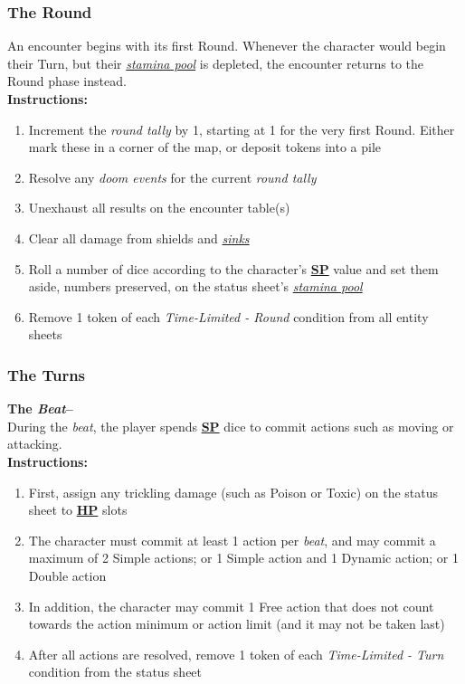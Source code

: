 \documentclass[12pt]{article}
\newcommand{\refto}[1]{\hyperlink{#1}{\textbf{#1}}}
\newcommand{\reftoit}[1]{\hyperlink{#1}{\emph{#1}}}
\begin{document}
\begin{multicols*}{2}
\subsubsection{The Round}
An encounter begins with its first Round. Whenever the character would begin their Turn, but their \reftoit{stamina pool} is depleted, the encounter returns to the Round phase instead.\\
\textbf{Instructions:}
\begin{enumerate}
\item Increment the \emph{round tally} by 1, starting at 1 for the very first Round. Either mark these in a corner of the map, or deposit tokens into a pile
\item Resolve any \emph{doom events} for the current \emph{round tally}
\item Unexhaust all results on the encounter table(s)
\item Clear all damage from shields and \reftoit{sinks}
\item Roll a number of dice according to the character’s \refto{SP} value and set them aside, numbers preserved, on the status sheet’s \reftoit{stamina pool}
\item Remove 1 token of each \emph{Time-Limited - Round} condition from all entity sheets
\end{enumerate}

\subsubsection{The Turns}
\textbf{The \emph{Beat}--}\\
During the \emph{beat}, the player spends \refto{SP} dice to commit actions such as moving or attacking.\\
\textbf{Instructions:}
\begin{enumerate}
\item First, assign any trickling damage (such as Poison or Toxic) on the status sheet to \refto{HP} slots
\item The character must commit at least 1 action per \emph{beat}, and may commit a maximum of 2 Simple actions; or 1 Simple action and 1 Dynamic action; or 1 Double action
\item In addition, the character may commit 1 Free action that does not count towards the action minimum or action limit (and it may not be taken last)
\item After all actions are resolved, remove 1 token of each \emph{Time-Limited - Turn} condition from the status sheet
\end{enumerate}


\end{multicols*}
\end{document}
